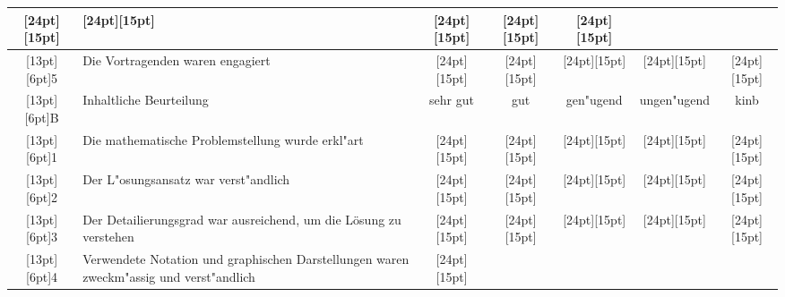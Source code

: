 \documentclass[a4paper,12pt]{article}
\begin{document}
\begin{center}
\begin{tabular}{|c|l|c|c|c|c|c|}
\raisebox{0pt}[24pt][15pt]{\phantom{XX}}&
\raisebox{0pt}[24pt][15pt]{\phantom{XX}}&
\raisebox{0pt}[24pt][15pt]{\phantom{XX}}&
\raisebox{0pt}[24pt][15pt]{\phantom{XX}}&
\raisebox{0pt}[24pt][15pt]{\phantom{XX}}\\
\hline
\raisebox{0pt}[13pt][6pt]{5}&
\begin{minipage}{6.6cm}\raggedright\strut
Die Vortragenden waren engagiert
\strut\end{minipage}&
\raisebox{0pt}[24pt][15pt]{\phantom{XX}}&
\raisebox{0pt}[24pt][15pt]{\phantom{XX}}&
\raisebox{0pt}[24pt][15pt]{\phantom{XX}}&
\raisebox{0pt}[24pt][15pt]{\phantom{XX}}&
\raisebox{0pt}[24pt][15pt]{\phantom{XX}}\\
\hline
\hline
\raisebox{0pt}[13pt][6pt]{B}&Inhaltliche Beurteilung&sehr gut&gut&gen"ugend&ungen"ugend&kinb\\
\hline
\raisebox{0pt}[13pt][6pt]{1}&
\begin{minipage}{6.6cm}\raggedright\strut
Die mathematische Problemstellung wurde erkl"art
\strut\end{minipage}&
\raisebox{0pt}[24pt][15pt]{\phantom{XX}}&
\raisebox{0pt}[24pt][15pt]{\phantom{XX}}&
\raisebox{0pt}[24pt][15pt]{\phantom{XX}}&
\raisebox{0pt}[24pt][15pt]{\phantom{XX}}&
\raisebox{0pt}[24pt][15pt]{\phantom{XX}}\\
\hline
\raisebox{0pt}[13pt][6pt]{2}&
\begin{minipage}{6.6cm}\raggedright\strut
Der L"osungsansatz war verst"andlich
\strut\end{minipage}&
\raisebox{0pt}[24pt][15pt]{\phantom{XX}}&
\raisebox{0pt}[24pt][15pt]{\phantom{XX}}&
\raisebox{0pt}[24pt][15pt]{\phantom{XX}}&
\raisebox{0pt}[24pt][15pt]{\phantom{XX}}&
\raisebox{0pt}[24pt][15pt]{\phantom{XX}}\\
\hline
\raisebox{0pt}[13pt][6pt]{3}&
\begin{minipage}{6.6cm}\raggedright\strut
Der Detailierungsgrad war ausreichend, um die
Lösung zu verstehen
\strut\end{minipage}&
\raisebox{0pt}[24pt][15pt]{\phantom{XX}}&
\raisebox{0pt}[24pt][15pt]{\phantom{XX}}&
\raisebox{0pt}[24pt][15pt]{\phantom{XX}}&
\raisebox{0pt}[24pt][15pt]{\phantom{XX}}&
\raisebox{0pt}[24pt][15pt]{\phantom{XX}}\\
\hline
\raisebox{0pt}[13pt][6pt]{4}&
\begin{minipage}{6.6cm}\raggedright\strut
Verwendete Notation und graphischen Darstellungen waren
zweckm"assig und verst"andlich
\strut\end{minipage}&
\raisebox{0pt}[24pt][15pt]{\phantom{XX}}&

\end{tabular}
\end{center}
\end{document}
